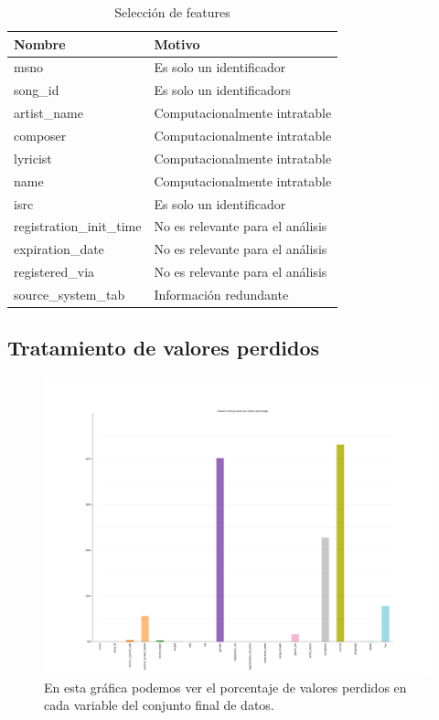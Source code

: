 \documentclass[a4paper]{article}
\begin{document}
\begin{table}[H]
\centering
\caption{Selección de features}
\label{my-label}
\begin{tabular}{|l|l|}
\hline
Nombre                   & Motivo \\ \hline
msno                     & Es solo un identificador \\ \hline
song\_id                 & Es solo un identificadors \\ \hline
artist\_name             & Computacionalmente intratable \\ \hline
composer                 & Computacionalmente intratable \\ \hline
lyricist                 & Computacionalmente intratable    \\ \hline
name                     & Computacionalmente intratable     \\ \hline
isrc                     & Es solo un identificador    \\ \hline
registration\_init\_time  & No es relevante para el análisis \\ \hline
expiration\_date	      & No es relevante para el análisis \\ \hline
registered\_via          & No es relevante para el análisis \\ \hline
source\_system\_tab        & Información redundante \\ \hline

\end{tabular}
\end{table}


\subsection{Tratamiento de valores perdidos}
\begin{figure}[H]
\centering
\includegraphics[width=1\textwidth]{Images/missings_percentage.png}
\caption{En esta gráfica podemos ver el porcentaje de valores perdidos en cada variable del conjunto final de datos.}
\end{figure}
\end{document}
